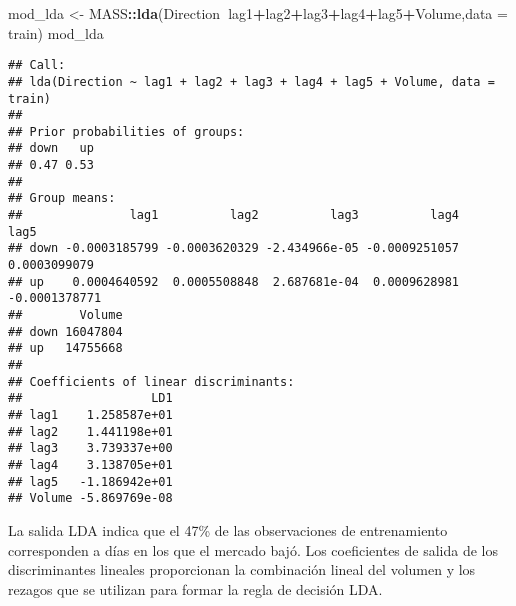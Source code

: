 \documentclass[
]{article}
\newenvironment{Shaded}{\begin{snugshade}}{\end{snugshade}}
\newcommand{\CommentTok}[1]{\textcolor[rgb]{0.56,0.35,0.01}{\textit{#1}}}
\newcommand{\DataTypeTok}[1]{\textcolor[rgb]{0.13,0.29,0.53}{#1}}
\newcommand{\DecValTok}[1]{\textcolor[rgb]{0.00,0.00,0.81}{#1}}
\newcommand{\KeywordTok}[1]{\textcolor[rgb]{0.13,0.29,0.53}{\textbf{#1}}}
\newcommand{\NormalTok}[1]{#1}
\newcommand{\OperatorTok}[1]{\textcolor[rgb]{0.81,0.36,0.00}{\textbf{#1}}}
\newcommand{\StringTok}[1]{\textcolor[rgb]{0.31,0.60,0.02}{#1}}
\begin{document}
\begin{Shaded}
\end{Shaded}

\begin{Shaded}
\begin{Highlighting}[]
\NormalTok{mod_lda <-}\StringTok{ }\NormalTok{MASS}\OperatorTok{::}\KeywordTok{lda}\NormalTok{(Direction}\OperatorTok{~}\NormalTok{lag1}\OperatorTok{+}\NormalTok{lag2}\OperatorTok{+}\NormalTok{lag3}\OperatorTok{+}\NormalTok{lag4}\OperatorTok{+}\NormalTok{lag5}\OperatorTok{+}\NormalTok{Volume,}\DataTypeTok{data =}\NormalTok{ train)}
\NormalTok{mod_lda}
\end{Highlighting}
\end{Shaded}

\begin{verbatim}
## Call:
## lda(Direction ~ lag1 + lag2 + lag3 + lag4 + lag5 + Volume, data = train)
## 
## Prior probabilities of groups:
## down   up 
## 0.47 0.53 
## 
## Group means:
##               lag1          lag2          lag3          lag4          lag5
## down -0.0003185799 -0.0003620329 -2.434966e-05 -0.0009251057  0.0003099079
## up    0.0004640592  0.0005508848  2.687681e-04  0.0009628981 -0.0001378771
##        Volume
## down 16047804
## up   14755668
## 
## Coefficients of linear discriminants:
##                  LD1
## lag1    1.258587e+01
## lag2    1.441198e+01
## lag3    3.739337e+00
## lag4    3.138705e+01
## lag5   -1.186942e+01
## Volume -5.869769e-08
\end{verbatim}

La salida LDA indica que el 47\% de las observaciones de entrenamiento
corresponden a días en los que el mercado bajó. Los coeficientes de
salida de los discriminantes lineales proporcionan la combinación lineal
del volumen y los rezagos que se utilizan para formar la regla de
decisión LDA.

\begin{Shaded}
\end{Shaded}
\end{document}
